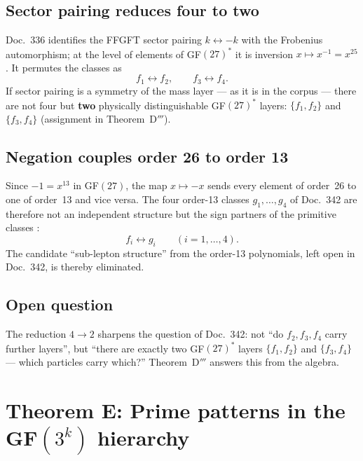 \subsection{Sector pairing reduces four to two}

Doc.~336 identifies the FFGFT sector pairing $k \leftrightarrow -k$ with the
Frobenius automorphism; at the level of elements of GF$(27)^*$ it is inversion
$x \mapsto x^{-1} = x^{25}$. It permutes the classes as \BM
\begin{equation}
  f_1 \longleftrightarrow f_2, \qquad f_3 \longleftrightarrow f_4 .
\end{equation}
If sector pairing is a symmetry of the mass layer --- as it is in the corpus ---
there are not four but \textbf{two} physically distinguishable GF$(27)^*$ layers:
$\{f_1, f_2\}$ and $\{f_3, f_4\}$ (assignment in Theorem~D$'''$).

\subsection{Negation couples order 26 to order 13}

Since $-1 = x^{13}$ in GF$(27)$, the map $x \mapsto -x$ sends every element of
order~26 to one of order~13 and vice versa. The four order-13 classes
$g_1,\ldots,g_4$ of Doc.~342 are therefore not an independent structure but the
sign partners of the primitive classes \BM:
\begin{equation}
  f_i \leftrightarrow g_i \qquad (i = 1, \ldots, 4).
\end{equation}
The candidate ``sub-lepton structure'' from the order-13 polynomials, left open in
Doc.~342, is thereby eliminated.

\subsection{Open question}

The reduction $4 \to 2$ sharpens the question of Doc.~342: not ``do $f_2, f_3, f_4$
carry further layers'', but ``there are exactly two GF$(27)^*$ layers
$\{f_1, f_2\}$ and $\{f_3, f_4\}$ --- which particles carry which?''
Theorem~D$'''$ answers this from the algebra.

\section{Theorem E: Prime patterns in the GF$(3^k)$ hierarchy}


